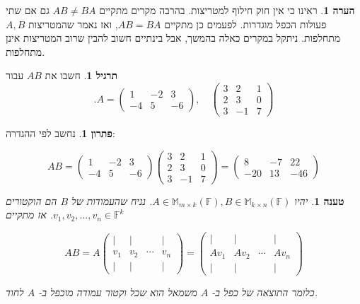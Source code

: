 \documentclass[12pt]{report}
\theoremstyle{plain}
\newtheorem{proposition}[theorem]{טענה}
\theoremstyle{definition}
\newtheorem{exercise}{תרגיל}[chapter]
\newtheorem{remark}{הערה}[chapter]
\newtheorem*{solution}{פתרון}
\newcommand{\F}{\mathbb{F}}
\newcommand{\M}{\mathbb{M}}
\newcommand{\0}{\mathbf{0}}
\begin{document}
\begin{remark}
ראינו כי אין חוק חילוף למטריצות. בהרבה מקרים מתקיים 
$
AB\neq BA
$
גם אם שתי פעולות הכפל מוגדרות. לפעמים כן מתקיים
$AB=BA$,
ואז נאמר שהמטריצות
$A,B$
מתחלפות. ניתקל במקרים כאלה בהמשך, אבל בינתיים חשוב להבין שרוב המטריצות אינן מתחלפות.
\end{remark}

\begin{exercise}
חשבו את
$AB$
עבור
$$
.A=\begin{pmatrix}
1 & -2 & 3 \\
-4 & 5 & -6
\end{pmatrix}, \quad
\begin{pmatrix}
3 & 2 & 1 \\
2 & 3 & 0 \\
3 & -1 & 7
\end{pmatrix}
$$
\end{exercise}

\begin{solution}
נחשב לפי ההגדרה:

$$
AB=
\begin{pmatrix}
1 & -2 & 3 \\
-4 & 5 & -6
\end{pmatrix}
\begin{pmatrix}
3 & 2 & 1 \\
2 & 3 & 0 \\
3 & -1 & 7
\end{pmatrix}
=
\begin{pmatrix}
8 & -7 & 22 \\
-20 & 13 & -46
\end{pmatrix}
$$
\end{solution}

\begin{proposition}\label{prop:product-column}
יהיו
$A\in\M_{m\times k}(\F), B\in\M_{k\times n}(\F)$.
נניח שהעמודות של
$B$
הם הוקטורים
$v_1,v_2,...,v_n\in\F^k$.
אז מתקיים

$$
AB=A\begin{pmatrix}
| & | & & | \\
v_1 & v_2 & \cdots & v_n \\
| & | & & |
\end{pmatrix}=\begin{pmatrix}
| & | & & | \\
Av_1 & Av_2 & \cdots & Av_n \\
| & | & & |
\end{pmatrix}
$$

כלומר התוצאה של כפל ב-
$A$
משמאל הוא שכל וקטור עמודה 
מוכפל ב-
$A$
לחוד.

\end{proposition}
\end{document}
